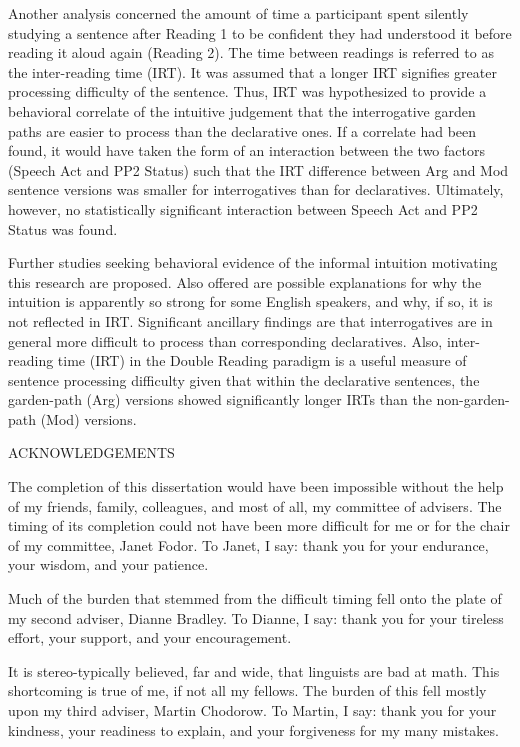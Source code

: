 \documentclass[11pt,oneside]{book}
\begin{document}
Another analysis concerned the amount of time a participant spent silently studying a sentence after Reading 1 to be confident they had understood it before reading it aloud again (Reading 2). The time between readings is referred to as the inter-reading time (IRT). It was assumed that a longer IRT signifies greater processing difficulty of the sentence. Thus, IRT was hypothesized to provide a behavioral correlate of the intuitive judgement that the interrogative garden paths are easier to process than the declarative ones. If a correlate had been found, it would have taken the form of an interaction between the two factors (Speech Act and PP2 Status) such that the IRT difference between Arg and Mod sentence versions was smaller for interrogatives than for declaratives.  Ultimately, however, no statistically significant interaction between Speech Act and PP2 Status was found. 

Further studies seeking behavioral evidence of the informal intuition motivating this research are proposed. Also offered are possible explanations for why the intuition is apparently so strong for some English speakers, and why, if so, it is not reflected in IRT. Significant ancillary findings are that interrogatives are in general more difficult to process than corresponding declaratives. Also, inter-reading time (IRT) in the Double Reading paradigm is a useful measure of sentence processing difficulty given that within the declarative sentences, the garden-path (Arg) versions showed significantly longer IRTs than the non-garden-path (Mod) versions. 

\pagebreak

\centering 
ACKNOWLEDGEMENTS

\vspace{0.5in}
\raggedright

The completion of this dissertation would have been impossible without the help of my friends, family, colleagues, and most of all, my committee of advisers. The timing of its completion could not have been more difficult for me or for the chair of my committee, Janet Fodor. To Janet, I say: thank you for your endurance, your wisdom, and your patience. 

Much of the burden that stemmed from the difficult timing fell onto the plate of my second adviser, Dianne Bradley. To Dianne, I say: thank you for your tireless effort, your support, and your encouragement.
	
It is stereo-typically believed, far and wide, that linguists are bad at math. This shortcoming is true of me, if not all my fellows. The burden of this fell mostly upon my third adviser, Martin Chodorow. To Martin, I say: thank you for your kindness, your readiness to explain, and your forgiveness for my many mistakes.
\end{document}
